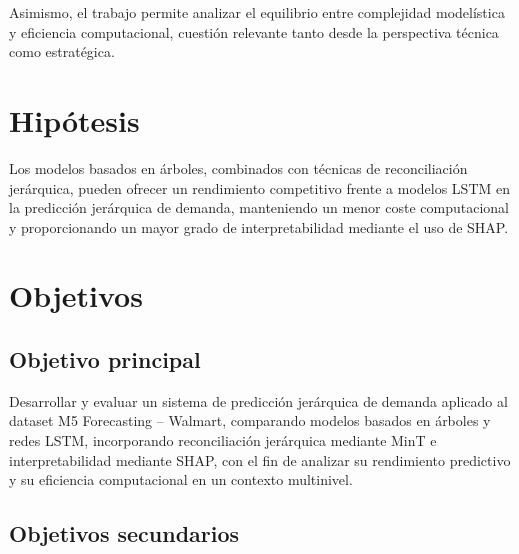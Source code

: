 \documentclass[IB,BIB]{TFUOC}%
\begin{document}
Asimismo, el trabajo permite analizar el equilibrio entre complejidad
modelística y eficiencia computacional, cuestión relevante tanto desde
la perspectiva técnica como estratégica.

\section{Hipótesis}

Los modelos basados en árboles, combinados con técnicas de
reconciliación jerárquica, pueden ofrecer un rendimiento competitivo
frente a modelos LSTM en la predicción jerárquica de demanda,
manteniendo un menor coste computacional y proporcionando un mayor grado
de interpretabilidad mediante el uso de SHAP.

\section{Objetivos}

\subsection{Objetivo principal}

Desarrollar y evaluar un sistema de predicción jerárquica de demanda
aplicado al dataset M5 Forecasting -- Walmart, comparando modelos
basados en árboles y redes LSTM, incorporando reconciliación jerárquica
mediante MinT e interpretabilidad mediante SHAP, con el fin de analizar
su rendimiento predictivo y su eficiencia computacional en un contexto
multinivel.

\subsection{Objetivos secundarios}
\end{document}
